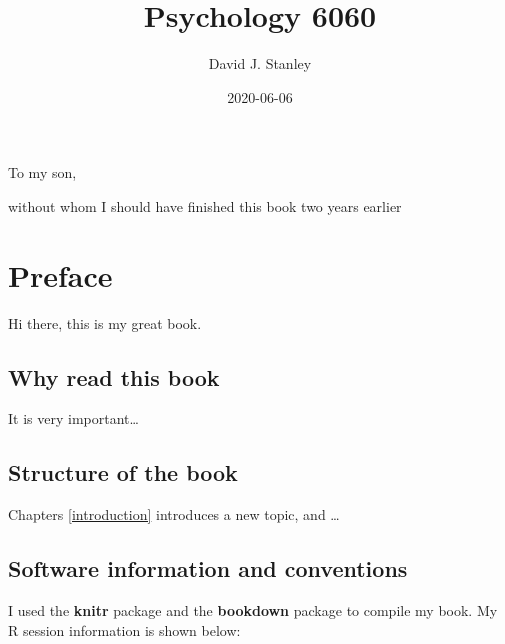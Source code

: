 \documentclass[
]{krantz}
\title{Psychology 6060}
\author{David J. Stanley}
\date{2020-06-06}
\begin{document}
\maketitle


\thispagestyle{empty}

\begin{center}
To my son,

without whom I should have finished this book two years earlier
\end{center}

\setlength{\abovedisplayskip}{-5pt}
\setlength{\abovedisplayshortskip}{-5pt}

{
\hypersetup{linkcolor=}
\setcounter{tocdepth}{2}
\tableofcontents
}
\listoftables
\listoffigures
\hypertarget{preface}{%
\chapter*{Preface}\label{preface}}


Hi there, this is my great book.

\hypertarget{why-read-this-book}{%
\section*{Why read this book}\label{why-read-this-book}}


It is very important\ldots{}

\hypertarget{structure-of-the-book}{%
\section*{Structure of the book}\label{structure-of-the-book}}


Chapters \ref{introduction} introduces a new topic, and \ldots{}

\hypertarget{software-information-and-conventions}{%
\section*{Software information and conventions}\label{software-information-and-conventions}}


I used the \textbf{knitr} package \citep{xie2015} and the \textbf{bookdown} package \citep{R-bookdown} to compile my book. My R session information is shown below:
\end{document}
